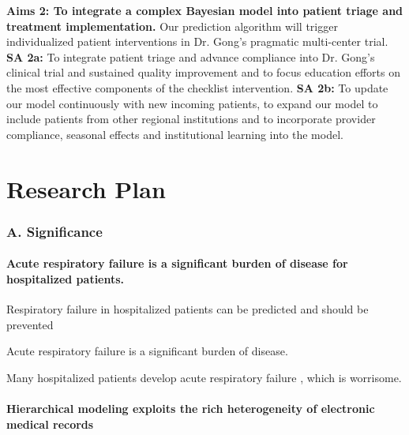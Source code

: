 \documentclass[11pt,notitlepage]{article}
\begin{document}
\textbf{Aims 2: To integrate a complex Bayesian model into patient triage and treatment implementation.} \newline Our prediction algorithm will trigger individualized patient interventions in Dr. Gong's pragmatic multi-center trial. 
\newline \textbf{SA 2a:} To integrate patient triage and advance compliance into Dr. Gong's clinical trial and sustained quality improvement and to focus education efforts on the most effective components of the checklist intervention.
\newline \textbf{SA 2b:} To update our model continuously with new incoming patients, to expand our model to include patients from other regional institutions and to incorporate provider compliance, seasonal effects and institutional learning into the model.

\newpage
\part*{Research Plan}

\section*{A. Significance}

\subsection*{Acute respiratory failure is a significant burden of disease for hospitalized patients.}

\subparagraph*{Respiratory failure in hospitalized patients can be predicted and should be prevented}


\subparagraph{Acute respiratory failure is a significant burden of disease.}
Many hospitalized patients develop acute respiratory failure \cite{shinystan}, which is worrisome.

\subsection*{Hierarchical modeling exploits the rich heterogeneity of electronic medical records}
\end{document}

